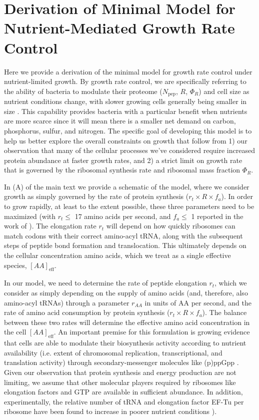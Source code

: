 \section{Derivation of Minimal Model for Nutrient-Mediated Growth Rate Control}
\label{sec:SI_model}
Here we provide a derivation of the minimal model for growth rate control under
nutrient-limited growth. By growth rate control, we are specifically referring
to the ability of bacteria to modulate their proteome ($N_\text{pep}$, $R$,
$\Phi_R$) and cell size as nutrient conditions change, with slower growing cells
generally being smaller in size \citep{ojkic2019}. This capability provides
bacteria with  a particular benefit when nutrients are more scarce since it will
mean there is a  smaller net demand on carbon, phosphorus, sulfur, and nitrogen.
The specific goal  of developing this model is to help us better explore the
overall constraints on  growth that follow from 1) our observation that many  of
the cellular processes we've considered require increased protein abundance at
faster growth rates, and 2) a strict limit on growth rate that is
governed by the ribosomal synthesis rate and ribosomal mass fraction $\Phi_R$.

In (A) of the main text we provide a schematic of the
model, where we consider growth as simply governed by the rate of protein
synthesis ($r_t \times R \times f_a$). In order to grow rapidly, at least to the
extent possible, these three parameters need to be maximized (with $r_t \leq$ 17
amino acids per second, and $f_a \leq$ 1 reported in the work of
\cite{dai2016}). The elongation rate $r_t$ will depend on how quickly
ribosomes can match codons with their correct amino-acyl tRNA, along with the
subsequent steps of peptide bond formation and translocation. This ultimately
depends on the cellular concentration amino acids, which we treat as a single
effective species, $[AA]_\text{eff}$.

In our model, we need to determine the rate of peptide elongation $r_t$, which we
consider as simply depending on the supply of amino acids (and,
therefore, also amino-acyl tRNAs) through a parameter $r_{AA}$ in units of AA
per second, and the rate of amino acid consumption by protein synthesis ($r_t
\times R \times f_a$). The balance between these two rates will determine the
effective amino acid concentration in the cell $[AA]_\text{eff}$. An important
premise for this formulation is growing evidence that cells are able to modulate
their biosynthesis activity according to nutrient availability (i.e. extent of
chromosomal replication, transcriptional, and translation activity) through
secondary-messenger molecules like (p)ppGpp \citep{hauryliuk2015, zhu2019,
kraemer2019, fernandezcoll2020, Buke2020}. Given our observation that protein
synthesis and energy production are not limiting, we assume that other molecular
players required by ribosomes like elongation factors and GTP are available in
sufficient abundance. In addition, experimentally, the relative number of tRNA
and elongation factor EF-Tu per ribosome have been found to increase in poorer
nutrient conditions \cite{pedersen1978, dong1996, klumpp2013}).

